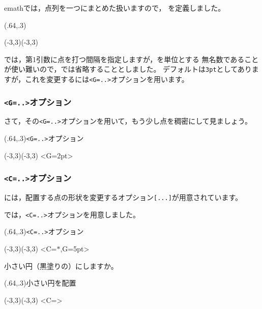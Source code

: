 \subsubsection{}
\textsf{emath}では，点列を一つにまとめた扱いますので，
を定義しました。

\begin{showEx}(.64,.3){}
\begin{zahyou}[ul=5mm](-3,3)(-3,3)
  \emDottedline{\A\B}
\end{zahyou}
\end{showEx}

では，第1引数に点を打つ間隔を指定しますが，を単位とする
無名数であることが使い難いので，では省略することとしました。
デフォルトは\verb+3pt+としてありますが，これを変更するには\verb+<G=..>+オプションを用います。

\subsubsection{\texttt{<G=..>}オプション}
さて，その\verb+<G=..>+オプションを用いて，もう少し点を稠密にして見ましょう。

\begin{showEx}(.64,.3){\texttt{<G=..>}オプション}
\begin{zahyou}[ul=5mm](-3,3)(-3,3)
  \emDottedline<G=2pt>{\A\B}
\end{zahyou}
\end{showEx}
\newpage

\subsubsection{\texttt{<C=..>}オプション}
には，配置する点の形状を変更するオプション\verb+[...]+が用意されています。

では，\verb+<C=..>+オプションを用意しました。

\begin{showEx}(.64,.3){\texttt{<C=..>}オプション}
\begin{zahyou}[ul=5mm](-3,3)(-3,3)
  \emDottedline<C=$*$,G=5pt>{\A\B}
\end{zahyou}
\end{showEx}

小さい円（黒塗りの）にしますか。

\begin{showEx}(.64,.3){小さい円を配置}
\begin{zahyou}[ul=5mm](-3,3)(-3,3)
  \ukansan{1pt}\tyokkei
  \emDottedline<C=\circle*\tyokkei>{\A\B}
\end{zahyou}
\end{showEx}

